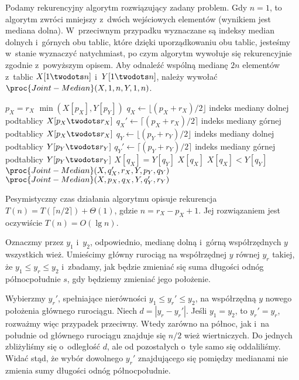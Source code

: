 Podamy rekurencyjny algorytm rozwiązujący zadany problem.
Gdy $n=1$, to algorytm zwróci mniejszy z~dwóch wejściowych elementów (wynikiem jest mediana dolna).
W~przeciwnym przypadku wyznaczane są indeksy median dolnych i~górnych obu tablic, które dzięki uporządkowaniu obu tablic, jesteśmy w~stanie wyznaczyć natychmiast, po czym algorytm wywołuje się rekurencyjnie zgodnie z~powyższym opisem.
Aby odnaleźć wspólną medianę $2n$ elementów z~tablic $X[1\twodots n]$ i~$Y[1\twodots n]$, należy wywołać $\proc{Joint-Median}(X,1,n,Y,1,n)$.
\begin{codebox}
\li	\If $p_X=r_X$
\li		\Then \Return $\min(X[p_X],Y[p_Y])$
		\End
\li	$q_X\gets\lfloor(p_X+r_X)/2\rfloor$ \>\>\>\>\>\>\Comment indeks mediany dolnej podtablicy $X[p_X\twodots r_X]$
\li	$q_X'\gets\lceil(p_X+r_X)/2\rceil$ \>\>\>\>\>\>\Comment indeks mediany górnej podtablicy $X[p_X\twodots r_X]$
\li	$q_Y\gets\lfloor(p_Y+r_Y)/2\rfloor$ \>\>\>\>\>\>\Comment indeks mediany dolnej podtablicy $Y[p_Y\twodots r_Y]$
\li	$q_Y'\gets\lceil(p_Y+r_Y)/2\rceil$ \>\>\>\>\>\>\Comment indeks mediany górnej podtablicy $Y[p_Y\twodots r_Y]$
\li	\If $X[q_X]=Y[q_Y]$
\li		\Then \Return $X[q_X]$
		\End
\li	\If $X[q_X]<Y[q_Y]$
\li		\Then \Return $\proc{Joint-Median}(X,q_X',r_X,Y,p_Y,q_Y)$
\li		\Else \Return $\proc{Joint-Median}(X,p_X,q_X,Y,q_Y',r_Y)$
		\End
\end{codebox}

Pesymistyczny czas działania algorytmu opisuje rekurencja $T(n)=T(\lceil n/2\rceil)+\Theta(1)$, gdzie $n=r_X-p_X+1$.
Jej rozwiązaniem jest oczywiście $T(n)=O(\lg n)$.

\exercise %
Oznaczmy przez $y_1$ i~$y_2$, odpowiednio, medianę dolną i~górną współrzędnych $y$ wszystkich wież.
Umieścimy główny rurociąg na współrzędnej $y$ równej $y_r$ takiej, że $y_1\le y_r\le y_2$ i~zbadamy, jak będzie zmieniać się suma długości odnóg północ\nbhyphen południe $s$, gdy będziemy zmieniać jego położenie.

Wybierzmy $y_r'$, spełniające nierówności $y_1\le y_r'\le y_2$, na współrzędną $y$ nowego położenia głównego rurociągu.
Niech $d=|y_r-y_r'|$.
Jeśli $y_1=y_2$, to $y_r'=y_r$, rozważmy więc przypadek przeciwny.
Wtedy zarówno na północ, jak i~na południe od głównego rurociągu znajduje się $n/2$ wież wiertniczych.
Do jednych zbliżyliśmy się o~odległość $d$, ale od pozostałych o~tyle samo się oddaliliśmy.
Widać stąd, że wybór dowolnego $y_r'$ znajdującego się pomiędzy medianami nie zmienia sumy długości odnóg północ\nbhyphen południe.

